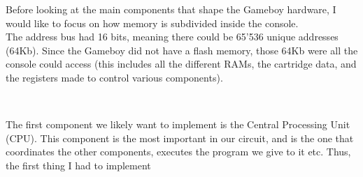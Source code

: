\documentclass{article}
\begin{document}
\newpage
Before looking at the main components that shape the Gameboy hardware, I would like to focus on how memory is subdivided inside the console.\\
The address bus had 16 bits, meaning there could be 65'536 unique addresses (64Kb). Since the Gameboy did not have a flash memory, those 64Kb were all the console could access (this includes all the different RAMs, the cartridge data, and the registers made to control various components).
\begin{center}
\begin{tabular}\{ c c }\ Cell1 & Cell2 \\ Cell1 & Cell2 \end{tabular}\

\end{center}

\newpage
The first component we likely want to implement is the Central Processing Unit (CPU). This component is the most important in our circuit, and is the one that coordinates the other components, executes the program we give to it etc. Thus, the first thing I had to implement
\end{document}
